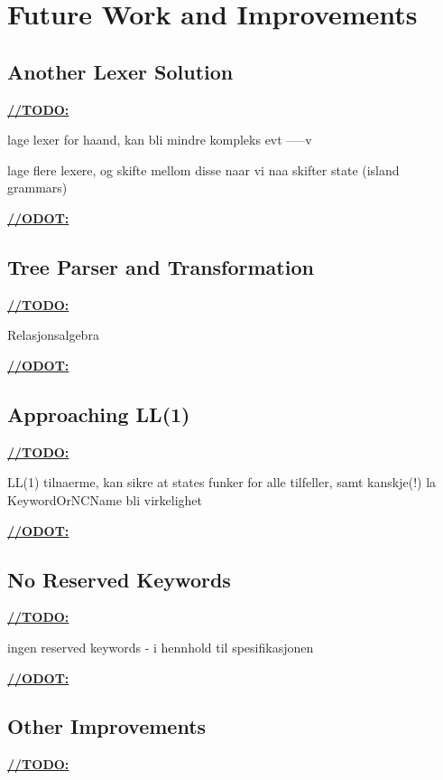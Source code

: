 \chapter{Future Work and Improvements}
\label{sect:summary:future_work}




\section{Another Lexer Solution}
\underline{\textbf{\LARGE //TODO:}}

lage lexer for haand, kan bli mindre kompleks evt -----v

lage flere lexere, og skifte mellom disse naar vi naa skifter state (island grammars)

\underline{\textbf{\LARGE //ODOT:}}

\section{Tree Parser and Transformation}
\underline{\textbf{\LARGE //TODO:}}

Relasjonsalgebra

\underline{\textbf{\LARGE //ODOT:}}

\section{Approaching LL(1)}

\underline{\textbf{\LARGE //TODO:}}

LL(1) tilnaerme, kan sikre at states funker for alle tilfeller, samt kanskje(!) la KeywordOrNCName bli virkelighet

\underline{\textbf{\LARGE //ODOT:}}

\section{No Reserved Keywords}

\underline{\textbf{\LARGE //TODO:}}

ingen reserved keywords - i hennhold til spesifikasjonen

\underline{\textbf{\LARGE //ODOT:}}

\section{Other Improvements}

\underline{\textbf{\LARGE //TODO:}}

